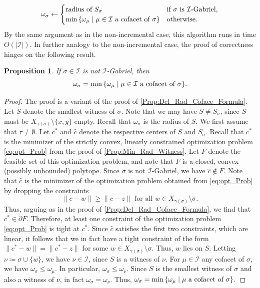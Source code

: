 \documentclass[11pt]{amsart}
\newcommand{\Incr}[0]{\mathcal{I}}
\theoremstyle{plain}
\newtheorem{proposition}[theorem]{Proposition}
\theoremstyle{definition}
\theoremstyle{remark}
\begin{document}
\[
\omega_{\sigma} \leftarrow
\begin{cases}
\text{radius of } S_\sigma & \text{if } \sigma \text{ is $\Incr$-Gabriel,} \\
\min\, \{\omega_{\mu} \mid \mu\in \Incr \textup{ a cofacet of } \sigma\} & \text{otherwise.}
\end{cases}
\]
By the same argument as in the non-incremental case, this algorithm runs in time $O(|\Incr|)$.  In further analogy to the non-incremental case, the 
proof of correctness hinges on the following result.
%
\begin{proposition}\label{Prop:Incr_Cofact_Formula}
If $\sigma \in \Incr$ is not $\Incr$-Gabriel, then \[\omega_\sigma =\min\, \{\omega_{\mu} \mid \mu\in \Incr \textup{ a cofacet of } \sigma\} .\]
\end{proposition}
%
\begin{proof}
The proof is a variant of the proof of \cref{Prop:Del_Rad_Coface_Formula}.  Let $S$ denote the smallest witness of $\sigma$.  Note that we may have $S\ne S_{\sigma}$, since $S$ must be $X_{\gamma(\sigma)}\setminus \{x,y\}$-empty.  Recall that  $\omega_{\sigma}$ is the radius of $S$.  
%
We first assume that $\tau\ne \emptyset$.  Let $c^*$ and $\hat c$ denote the respective centers of $S$ and $S_{\sigma}$. Recall that $c^*$ is the minimizer of the strictly convex, linearly constrained optimization problem \eqref{eq:opt_Prob} from the proof of \cref{Prop:Min_Rad_Witness}.  
Let $F$ denote the feasible set of this optimization problem, and note that $F$ is a closed, convex (possibly unbounded) polytope.  Since $\sigma$ is not $\Incr$-Gabriel, we have $\hat c\not \in F$.  Note that $\hat c$ is the minimizer of the optimization problem obtained from \eqref{eq:opt_Prob} by dropping the constraints 
\[  \|c - w\| \geq \|c - z\|
            \text{ for all } w \in X_{\gamma(\sigma)} \setminus \sigma.\]
Thus, arguing as in the proof of \cref{Prop:Del_Rad_Coface_Formula}, we find  that $c^*\in \partial F$.  Therefore, at least one constraint of the optimization problem \eqref{eq:opt_Prob} is tight at $c^*$.  Since $\hat c$ satisfies the first two constraints, which are linear, it follows that we in fact have a tight constraint of the form $\|c^* - w\| = \|c^* - z\|$ for some $w \in X_{\gamma(\sigma)} \setminus \sigma$.  Thus, $w$ lies on $S$.  Letting $\nu\coloneqq \sigma\cup\{w\}$, we have $\nu\in \Incr$, since $S$ is a witness of $\nu$.  
%
For $\mu\in \Incr$ any cofacet of $\sigma$, we have  $\omega_{\sigma}\leq \omega_{\mu}$.  In particular, $\omega_{\sigma}\leq \omega_{\nu}$.  Since $S$ is the smallest witness of $\sigma$ and also a witness of $\nu$, in fact $ \omega_{\sigma}=\omega_{\nu}$.  Thus, $\omega_\sigma = {\min\, \{ \omega_\mu\mid \mu \textup{ a cofacet of } \sigma\}}.$

\end{proof}
\end{document}
